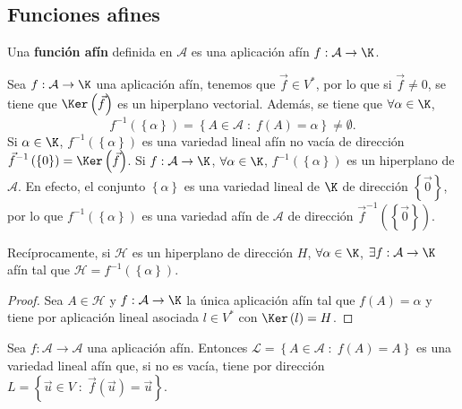 \subsection{Funciones afines}
\begin{fdefinition}
\normalfont Una \textbf{función afín} definida en $\displaystyle \mathcal{A} $ es una aplicación afín $\displaystyle f : \mathcal{A} \to \K $.
\end{fdefinition}
Sea $\displaystyle f : \mathcal{A} \to \K $ una aplicación afín, tenemos que $\displaystyle \vec{f} \in V^{*}$, por lo que si $\displaystyle \vec{f} \neq 0 $, se tiene que $\displaystyle \Ker\left(\vec{f}\right) $ es un hiperplano vectorial. Además, se tiene que $\displaystyle \forall \alpha \in \K $,
\[f^{-1}\left( \left\{ \alpha \right\} \right) = \left\{ A \in \mathcal{A} \; :\; f\left(A\right) = \alpha \right\} \neq \emptyset .\]
Si $\displaystyle \alpha \in \K $, $\displaystyle f^{-1}\left( \left\{ \alpha \right\} \right) $ es una variedad lineal afín no vacía de dirección $\displaystyle \vec{f}^{-1}\left( \left\{ 0\right\} \right) = \Ker\left(\vec{f}\right) $. Si $\displaystyle f: \mathcal{A} \to \K $, $\displaystyle \forall \alpha \in \K $, $\displaystyle f^{-1}\left( \left\{ \alpha \right\} \right) $ es un hiperplano de $\displaystyle \mathcal{A} $. En efecto, el conjunto $\displaystyle \left\{ \alpha \right\} $ es una variedad lineal de $\displaystyle \K $ de dirección $\displaystyle \left\{ \vec{0}\right\}  $, por lo que $\displaystyle f^{-1}\left( \left\{ \alpha \right\} \right) $ es una variedad afín de $\displaystyle \mathcal{A} $ de dirección $\displaystyle \vec{f}^{-1}\left( \left\{ \vec{0}\right\} \right) $.
\begin{fprop}[]
\normalfont 
Recíprocamente, si $\displaystyle \mathcal{H} $ es un hiperplano de dirección $\displaystyle H $, $\displaystyle \forall \alpha \in \K $, $\displaystyle \exists f : \mathcal{A} \to \K $ afín tal que $\displaystyle \mathcal{H} = f^{-1}\left( \left\{ \alpha \right\} \right) $.
\end{fprop}
\begin{proof}
Sea $\displaystyle A \in \mathcal{H} $ y $\displaystyle f : \mathcal{A} \to \K $ la única aplicación afín tal que $\displaystyle f\left(A\right) = \alpha  $ y tiene por aplicación lineal asociada $\displaystyle l \in V^{*} $ con $\displaystyle \Ker\left(l\right) = H $.
\end{proof}
\begin{fprop}[]
	\normalfont Sea $\displaystyle f : \mathcal{A} \to \mathcal{A} $ una aplicación afín. Entonces $\displaystyle \mathcal{L} = \left\{ A \in \mathcal{A} \; : \; f\left(A\right) = A\right\}  $ es una variedad lineal afín que, si no es vacía, tiene por dirección $\displaystyle L = \left\{ \vec{u} \in V \; : \; \vec{f}\left(\vec{u}\right) = \vec{u}\right\} $.
\end{fprop}
